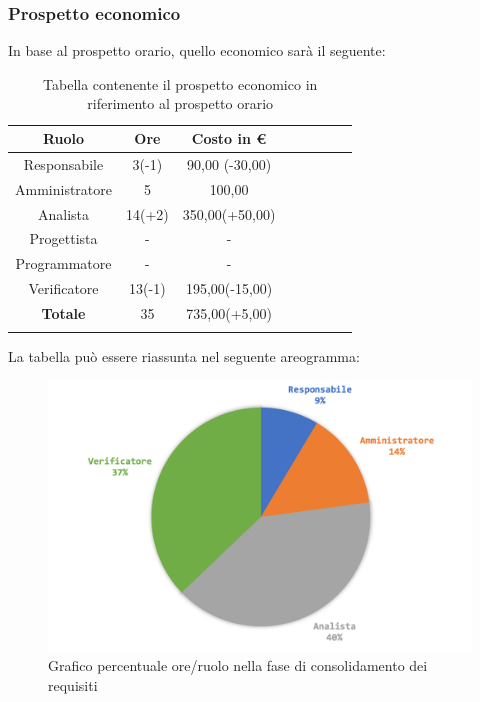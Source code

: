 		\subsubsection{Prospetto economico}
			In base al prospetto orario, quello economico sarà il seguente: 
			
			\begin{longtable}{|c|c|c|c|c|c|c|c}
				\hline
				\rowcolor{lighter-grayer}
				\textbf{Ruolo} & \textbf{Ore} & \textbf{Costo in €} \\
				\hline
				\endfirsthead
				
				\hline
				Responsabile & 3(-1) & 90,00 (-30,00)\\
				\hline
				\hline
				Amministratore & 5 & 100,00\\
				\hline
				\hline
				Analista & 14(+2) & 350,00(+50,00)\\
				\hline
				\hline
				Progettista & - & -\\
				\hline
				\hline
				Programmatore & -  & -\\
				\hline
				\hline
				Verificatore & 13(-1) & 195,00(-15,00)\\
				\hline
				\textbf{Totale} & 35 & 735,00(+5,00)\\
				\hline
				\caption{Tabella contenente il prospetto economico in riferimento al prospetto orario}
			\end{longtable}
			\pagebreak
			
			La tabella può essere riassunta nel seguente areogramma:
			\begin{figure}[H]
				\centering
				\includegraphics[width=0.8\linewidth]{images/consuntivo/ConsReqCons2.png}
				\caption{Grafico percentuale ore/ruolo nella fase di consolidamento dei requisiti}
				\label{fig:grafico costi ruolo fase di consolidamento dei requisiti}
			\end{figure}
		
